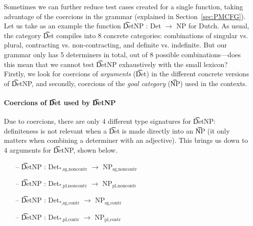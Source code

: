 
Sometimes we can further reduce test cases created for a single
function, taking advantage of the coercions in the grammar (explained
in Section~\ref{sec:PMCFG}).  Let us take as an example the function
\t{DetNP : Det $\rightarrow$ NP} for Dutch. As usual, the category
\t{Det} compiles into 8 concrete categories: combinations of singular
vs. plural, contracting vs.  non-contracting, and definite
vs. indefinite. But our grammar only has 5 determiners in total, out
of 8 possible combinations---does this mean that we cannot test
\t{DetNP} exhaustively with the small lexicon? Firstly, we look for
coercions of \emph{arguments} (\t{Det}) in the different concrete
versions of \t{DetNP}, and secondly, coercions of the \emph{goal
  category} (\t{NP}) used in the contexts.

\paragraph{Coercions of \t{Det} used by \t{DetNP}} Due to coercions, there are only 4
different type signatures for \t{DetNP}: definiteness is not relevant
when a \t{Det} is made directly into an \t{NP} (it only matters when
combining a determiner with an adjective). This brings us down to 4
arguments for \t{DetNP}, shown below.

\begin{itemize}
\setlength\itemsep{0em}
\item[--] \t{DetNP : Det$_{*\text{,sg,noncontr}}$ $\rightarrow$ NP$_\text{sg,noncontr}$}
\item[--] \t{DetNP : Det$_{*\text{,pl,noncontr}}$ $\rightarrow$ NP$_\text{pl,noncontr}$}
\item[--] \t{DetNP : Det$_{*\text{,sg,contr}}$ $\rightarrow$ NP$_\text{sg,contr}$}
\item[--] \t{DetNP : Det$_{*\text{,pl,contr}}$ $\rightarrow$ NP$_\text{pl,contr}$}
\end{itemize}

